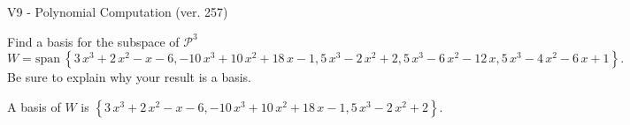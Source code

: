 \begin{exercise}
  \begin{exerciseTitle}V9 - Polynomial Computation (ver. 257)\end{exerciseTitle}
  \begin{exerciseStatement}
    Find a basis for the subspace of \(\mathcal{P}^3\) 
\[W=\mathrm{span}\ \left\{3 \, x^{3} + 2 \, x^{2} - x - 6 , -10 \, x^{3} + 10 \, x^{2} + 18 \, x - 1 , 5 \, x^{3} - 2 \, x^{2} + 2 , 5 \, x^{3} - 6 \, x^{2} - 12 \, x , 5 \, x^{3} - 4 \, x^{2} - 6 \, x + 1\right\}.\]
 Be sure to explain why your result is a basis.


  \end{exerciseStatement}
  \begin{exerciseAnswer}
   A basis of \(W\) is  \(\left\{3 \, x^{3} + 2 \, x^{2} - x - 6 , -10 \, x^{3} + 10 \, x^{2} + 18 \, x - 1 , 5 \, x^{3} - 2 \, x^{2} + 2\right\}\).
  


  \end{exerciseAnswer}
\end{exercise}
